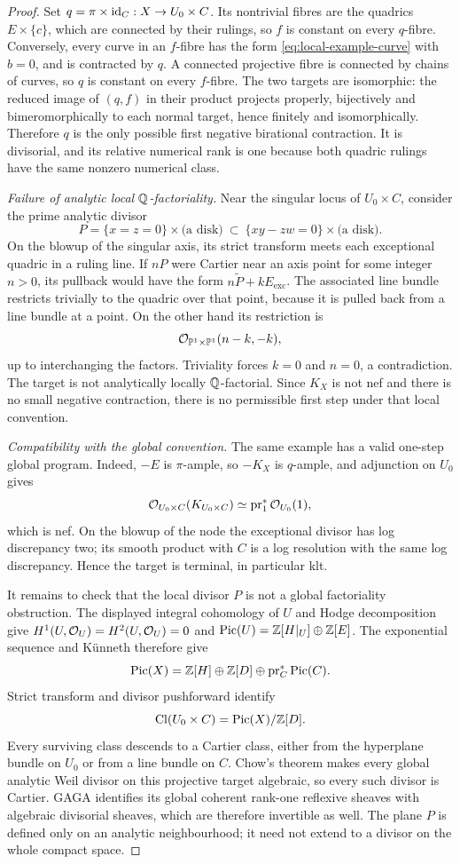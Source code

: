 \begin{proof}
Set $q=\pi\times\mathrm{id}_C:X\to U_0\times C$.
Its nontrivial fibres are the quadrics $E\times\{c\}$, which are connected
by their rulings, so $f$ is constant on every $q$-fibre.
Conversely, every curve in an $f$-fibre has the form
\eqref{eq:local-example-curve} with $b=0$, and is contracted by $q$.
A connected projective fibre is connected by chains of curves, so $q$ is
constant on every $f$-fibre.  The two targets are isomorphic: the reduced
image of $(q,f)$ in their product projects properly, bijectively and
bimeromorphically to each normal target, hence finitely and isomorphically.
Therefore $q$ is the only possible first negative birational contraction.
It is divisorial, and its relative numerical rank is one because both
quadric rulings have the same nonzero numerical class.

\emph{Failure of analytic local $\mathbb Q$-factoriality.}
Near the singular locus of $U_0\times C$, consider the prime analytic
divisor
\[
 P=\{x=z=0\}\times\text{(a disk)}
   \ \subset\ \{xy-zw=0\}\times\text{(a disk)}.
\]
On the blowup of the singular axis, its strict transform meets each
exceptional quadric in a ruling line.  If $nP$ were Cartier near an axis
point for some integer $n>0$, its pullback would have the form
$n\widetilde P+kE_{\mathrm{exc}}$.
The associated line bundle restricts trivially to the quadric over that
point, because it is pulled back from a line bundle at a point.
On the other hand its restriction is
\[
 \mathcal O_{\mathbb P^1\times\mathbb P^1}(n-k,-k),
\]
up to interchanging the factors.  Triviality forces $k=0$ and $n=0$, a
contradiction.  The target is not analytically locally $\mathbb Q$-factorial.
Since $K_X$ is not nef and there is no small negative contraction,
there is no permissible first step under that local convention.

\emph{Compatibility with the global convention.}
The same example has a valid one-step global program.  Indeed,
$-E$ is $\pi$-ample, so $-K_X$ is $q$-ample, and adjunction on $U_0$ gives
\[
 \mathcal O_{U_0\times C}(K_{U_0\times C})
 \simeq\operatorname{pr}_1^*\mathcal O_{U_0}(1),
\]
which is nef.  On the blowup of the node the exceptional divisor has log
discrepancy two; its smooth product with $C$ is a log resolution with the
same log discrepancy.  Hence the target is terminal, in particular klt.

It remains to check that the local divisor $P$ is not a global
factoriality obstruction.  The displayed integral cohomology of $U$ and
Hodge decomposition give $H^1(U,\mathcal O_U)=H^2(U,\mathcal O_U)=0$ and
$\operatorname{Pic}(U)=\mathbb Z[H|_U]\oplus\mathbb Z[E]$.
The exponential sequence and Künneth therefore give
\[
 \operatorname{Pic}(X)=\mathbb Z[H]\oplus\mathbb Z[D]\oplus\operatorname{pr}_C^*\operatorname{Pic}(C).
\]
Strict transform and divisor pushforward identify
\[
 \operatorname{Cl}(U_0\times C)=\operatorname{Pic}(X)/\mathbb Z[D].
\]
Every surviving class descends to a Cartier class, either from the
hyperplane bundle on $U_0$ or from a line bundle on $C$.
Chow's theorem makes every global analytic Weil divisor on this projective
target algebraic, so every such divisor is Cartier.
GAGA identifies its global coherent
rank-one reflexive sheaves with algebraic divisorial sheaves, which are
therefore invertible as well.  The plane $P$ is defined only on an analytic
neighbourhood; it need not extend to a divisor on the whole compact space.
\end{proof}
